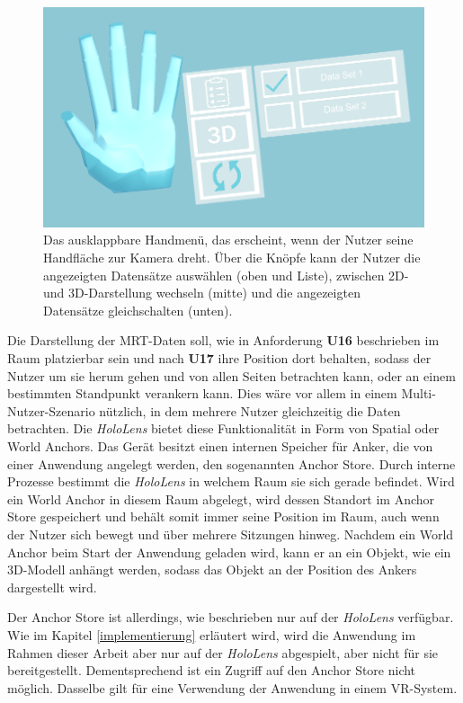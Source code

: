 \begin{figure}[!htb]
	\centering
	\includegraphics[width=0.7\linewidth]{images/handUI_2.png}
	\caption{Das ausklappbare Handmenü, das erscheint, wenn der Nutzer seine Handfläche zur Kamera dreht. Über die Knöpfe kann der Nutzer die angezeigten Datensätze auswählen (oben und Liste), zwischen 2D- und 3D-Darstellung wechseln (mitte) und die angezeigten Datensätze gleichschalten (unten). }
	\label{img:handUI}
\end{figure}
\FloatBarrier

Die Darstellung der MRT-Daten soll, wie in Anforderung \textbf{U16} beschrieben im Raum platzierbar sein und nach \textbf{U17} ihre Position dort behalten, sodass der Nutzer um sie herum gehen und von allen Seiten betrachten kann, oder an einem bestimmten Standpunkt verankern kann. Dies wäre vor allem in einem Multi-Nutzer-Szenario nützlich, in dem mehrere Nutzer gleichzeitig die Daten betrachten.
Die \textit{HoloLens} bietet diese Funktionalität in Form von Spatial oder World Anchors. Das Gerät besitzt einen internen Speicher für Anker, die von einer Anwendung angelegt werden, den sogenannten Anchor Store. Durch interne Prozesse bestimmt die \textit{HoloLens} in welchem Raum sie sich gerade befindet. Wird ein World Anchor in diesem Raum abgelegt, wird dessen Standort im Anchor Store gespeichert und behält somit immer seine Position im Raum, auch wenn der Nutzer sich bewegt und über mehrere Sitzungen hinweg. Nachdem ein World Anchor beim Start der Anwendung geladen wird, kann er an ein Objekt, wie ein 3D-Modell anhängt werden, sodass das Objekt an der Position des Ankers dargestellt wird. 

Der Anchor Store ist allerdings, wie beschrieben nur auf der \textit{HoloLens} verfügbar. Wie im Kapitel \ref{implementierung} erläutert wird, wird die Anwendung im Rahmen dieser Arbeit aber nur auf der \textit{HoloLens} abgespielt, aber nicht für sie bereitgestellt. Dementsprechend ist ein Zugriff auf den Anchor Store nicht möglich. Dasselbe gilt für eine Verwendung der Anwendung in einem VR-System.

